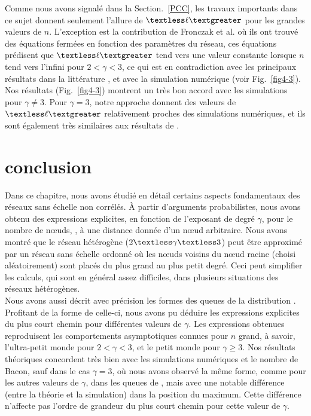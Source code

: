 Comme nous avons signalé dans la Section.~\ref{PCC}, les travaux importants \cite{Do-al2003,Cohen-Havlin2003} dans ce sujet donnent seulement l'allure de $\textless \ell \textgreater$  pour les grandes valeurs de $n$. L'exception est la contribution de Fronczak et  al. \cite{Fronczak-al2004} où ils ont trouvé des équations fermées en fonction des paramètres du réseau, ces équations prédisent que $\textless \ell \textgreater$  tend vers une valeur constante lorsque $n$ tend vers l'infini pour $2<\gamma<3$, ce qui est en contradiction avec les principaux résultats dans la littérature  \cite{Cohen-Havlin2003,Do-al2003,Cohen-al2002,Chung-Lu2002,Fox-Bellwood2014,Hofstad-al2014}, et avec la simulation numérique (voir Fig.~\ref{fig4-3}).\\ Nos résultats (Fig.~\ref{fig4-3}) montrent un très bon accord avec les simulations pour $\gamma\neq3$. Pour $\gamma=3$,  notre approche donnent des valeurs de $\textless \ell \textgreater$ relativement proches des simulations numériques, et ils sont également très similaires aux résultats de \cite{Fronczak-al2004}.
 \section{conclusion} 
Dans ce chapitre, nous avons étudié en détail certains aspects fondamentaux des réseaux sans échelle non corrélés. \`{A} partir d'arguments probabilistes, nous avons obtenu des expressions explicites, en fonction de l'exposant de degré $\gamma$, pour le nombre de nœuds, \nl, à une distance donnée d'un nœud arbitraire. Nous avons montré que le réseau hétérogène ($2 \textless \gamma \textless 3$) peut être
approximé par un réseau sans échelle ordonné où les nœuds voisins du nœud racine (choisi aléatoirement) sont placés du plus grand au plus petit degré. Ceci peut simplifier les calculs, qui sont en général assez difficiles, dans plusieurs situations des réseaux hétérogènes.\\
Nous avons aussi décrit avec précision les formes des queues de la distribution \nl.\\
Profitant de la forme de celle-ci, nous avons pu déduire les expressions explicites du plus court chemin pour différentes valeurs de $\gamma$. Les expressions obtenues reproduisent les comportements asymptotiques connues pour $n$ grand, à savoir, l'ultra-petit monde pour $2<\gamma<3$, et le petit monde pour $\gamma\ge 3$. Nos résultats théoriques concordent très bien avec les simulations numériques et le nombre de Bacon, sauf dans le cas $\gamma=3$, où nous avons observé la même forme, comme pour les autres valeurs de $\gamma$, dans les queues de \nl, mais avec une notable différence (entre la théorie et la simulation) dans la position du maximum. Cette différence n'affecte pas l'ordre de grandeur du plus court chemin pour cette valeur de $\gamma$.
\let\cleardoublepage\clearpage
